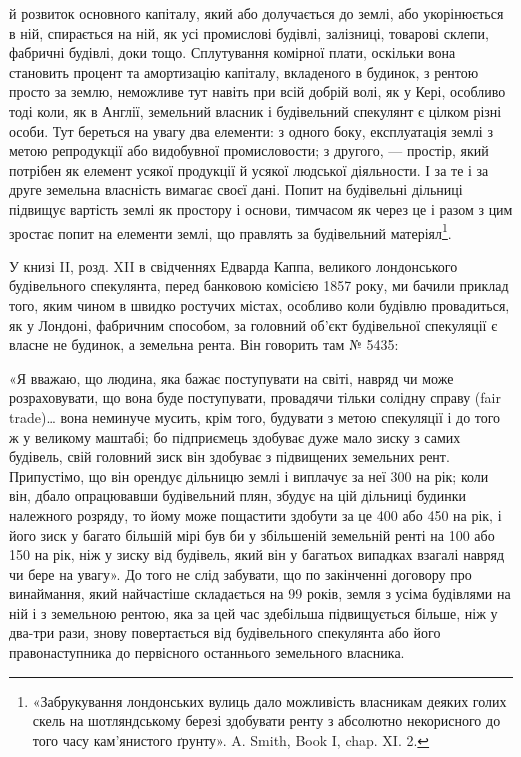 \parcont{}  %
й розвиток основного капіталу, який або долучається до землі, або укорінюється
в ній, спирається на ній, як усі промислові будівлі, залізниці, товарові склепи,
фабричні будівлі, доки тощо. Сплутування комірної плати, оскільки вона становить
процент та амортизацію капіталу, вкладеного в будинок, з рентою просто за
землю, неможливе тут навіть при всій добрій волі, як у Кері, особливо тоді
коли, як в Англії, земельний власник і будівельний спекулянт є цілком різні
особи. Тут береться на увагу два елементи: з одного боку, експлуатація землі
з метою репродукції або видобувної промисловости; з другого, — простір, який
потрібен як елемент усякої продукції й усякої людської діяльности. І за те і за
друге земельна власність вимагає своєї дані. Попит на будівельні дільниці підвищує
вартість землі як простору і основи, тимчасом як через це і разом
з цим зростає попит на елементи землі, що правлять за будівельний матеріял\footnote{
«Забрукування лондонських вулиць дало можливість власникам деяких голих скель на шотляндському
березі здобувати ренту з абсолютно некорисного до того часу кам’янистого ґрунту». A. Smith, Book I,
chap. XI. 2.
}.

У книзі II, розд. XII в свідченнях Едварда Каппа, великого лондонського
будівельного спекулянта, перед банковою комісією 1857 року, ми бачили приклад
того, яким чином в швидко ростучих містах, особливо коли будівлю провадиться,
як у Лондоні, фабричним способом, за головний об’єкт будівельної
спекуляції є власне не будинок, а земельна рента. Він говорить там № 5435:

«Я вважаю, що людина, яка бажає поступувати на світі, навряд чи може
розраховувати, що вона буде поступувати, провадячи тільки солідну справу (fair
trade)\dots{} вона неминуче мусить, крім того, будувати з метою спекуляції і до
того ж у великому маштабі; бо підприємець здобуває дуже мало зиску з самих
будівель, свій головний зиск він здобуває з підвищених земельних рент. Припустімо,
що він орендує дільницю землі і виплачує за неї 300 на рік;
коли він, дбало опрацювавши будівельний плян, збудує на цій дільниці будинки
належного розряду, то йому може пощастити здобути за це 400 або 450
на рік, і його зиск у багато більшій мірі був би у збільшеній земельній ренті
на 100 або 150 на рік, ніж у зиску від будівель, який він у багатьох
випадках взагалі навряд чи бере на увагу». До того не слід забувати, що
по закінченні договору про винаймання, який найчастіше складається на 99 років,
земля з усіма будівлями на ній і з земельною рентою, яка за цей час
здебільша підвищується більше, ніж у два-три рази, знову повертається від
будівельного спекулянта або його правонаступника до первісного останнього
земельного власника.

